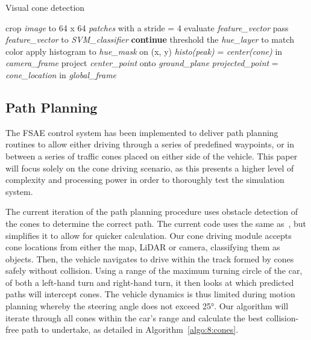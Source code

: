 \begin{algorithm}[H] %
	\caption{Visual cone detection}\label{algo:8:visualConeDetection}
	\begin{algorithmic}[1]
		\State crop \textit{image} to 64 x 64 \textit{patches} with a stride = 4
		\State evaluate \textit{feature\_vector}
		\State pass \textit{feature\_vector} to \textit{SVM\_classifier}
		\State \textbf{continue}
		\EndIf
		\State threshold the \textit{hue\_layer} to match color
		\State apply histogram to \textit{hue\_mask} on (x, y)
		\State \textit{histo(peak)} = \textit{center(cone)} in \textit{camera\_frame}
		\State project \textit{center\_point} onto \textit{ground\_plane}\;
		\State \textit{projected\_point} = \textit{cone\_location} in \textit{global\_frame}
		\EndFor
		\EndProcedure
	\end{algorithmic}
\end{algorithm}

\subsection{Path Planning} \label{subsec:8:pathPlanning}
The FSAE control system has been implemented to deliver path planning routines to allow either driving through a series of predefined waypoints, or in between a series of traffic cones placed on either side of the vehicle.
This paper will focus solely on the cone driving scenario, as this presents a higher level of complexity and processing power in order to thoroughly test the simulation system.

The current iteration of the path planning procedure uses obstacle detection of the cones to determine the correct path.
The current code uses the same as~\cite{lim_modular_2018}, but simplifies it to allow for quicker calculation.
Our cone driving module accepts cone locations from either the map, LiDAR or camera, classifying them as objects.
Then, the vehicle navigates to drive within the track formed by cones safely without collision.
Using a range of the maximum turning circle of the car, of both a left-hand turn and right-hand turn, it then looks at which predicted paths will intercept cones.
The vehicle dynamics is thus limited during motion planning whereby the steering angle does not exceed \ang{25}.
Our algorithm will iterate through all cones within the car's range and calculate the best collision-free path to undertake, as detailed in Algorithm~\ref{algo:8:cones}.


